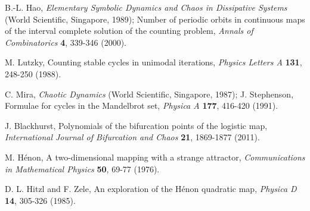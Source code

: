 \documentclass[twocolumn]{revtex4-1}
\begin{document}
\begin{thebibliography}{50}
 B.-L. Hao,
  \textit{Elementary Symbolic Dynamics and Chaos in  Dissipative Systems}
  (World Scientific, Singapore, 1989);
  Number of periodic orbits in continuous maps of
    the interval complete solution of the counting problem,
  \textit{Annals of Combinatorics}
  \textbf{4},
  339-346
  (2000).

 M. Lutzky,
  Counting stable cycles in unimodal iterations,
  \textit{Physics Letters A}
  \textbf{131},
  248-250
  (1988).

  C. Mira,
  \textit{Chaotic Dynamics}
  (World Scientific, Singapore, 1987);
  J. Stephenson,
  Formulae for cycles in the Mandelbrot set,
  \textit{Physica A}
  \textbf{177},
  416-420
  (1991).

 J. Blackhurst,
  Polynomials of the bifurcation points of the logistic map,
  \textit{International Journal of Bifurcation and Chaos}
  \textbf{21},
  1869-1877
  (2011).

 M. H\'enon,
  A two-dimensional mapping with a strange attractor,
  \textit{Communications in Mathematical Physics}
  \textbf{50},
  69-77
  (1976).

 D. L. Hitzl and F. Zele,
  An exploration of the H\'enon quadratic map,
  \textit{Physica D}
  \textbf{14},
  305-326
  (1985).

\end{thebibliography}
\end{document}
